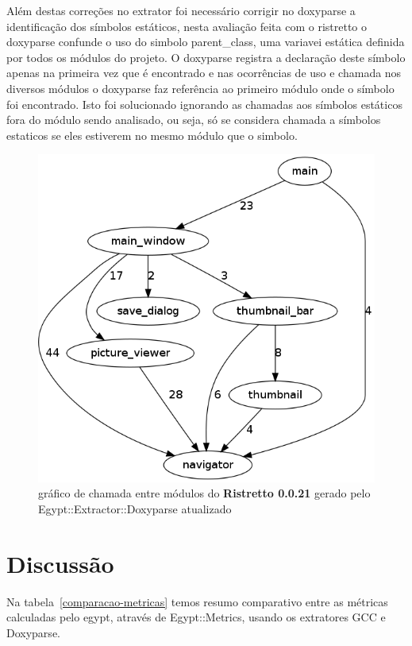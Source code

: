 Além destas correções no extrator foi necessário corrigir no doxyparse a
identificação dos símbolos estáticos, nesta avaliação feita com o ristretto o
doxyparse confunde o uso do simbolo parent\_class, uma variavei estática
definida por todos os módulos do projeto. O doxyparse registra a declaração
deste símbolo apenas na primeira vez que é encontrado e nas ocorrências de uso
e chamada nos diversos módulos o doxyparse faz referência ao primeiro módulo
onde o símbolo foi encontrado. Isto foi solucionado ignorando as chamadas aos
símbolos estáticos fora do módulo sendo analisado, ou seja, só se considera
chamada a símbolos estaticos se eles estiverem no mesmo módulo que o simbolo.

\begin{figure}
\center
\includegraphics[scale=0.3]{imagens/ristretto-0_0_21-doxyparse-2}
\caption{gráfico de chamada entre módulos do {\bf Ristretto 0.0.21} gerado pelo Egypt::Extractor::Doxyparse atualizado}
\label{ristretto-0.0.21-doxyparse-2}
\end{figure}

\section{Discussão}

Na tabela~\ref{comparacao-metricas} temos resumo comparativo entre as métricas calculadas pelo egypt, através de Egypt::Metrics, usando os extratores GCC e Doxyparse.

